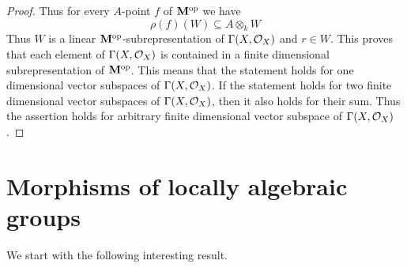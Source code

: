 \begin{proof}
Thus for every $A$-point $f$ of $\mathbf{M}^{\mathrm{op}}$ we have
$$\rho(f)\left(W\right) \subseteq A\otimes_kW$$
Thus $W$ is a linear $\mathbf{M}^{\mathrm{op}}$-subrepresentation of $\Gamma(X,{\mathcal O}_X)$ and $r\in W$. This proves that each element of $\Gamma(X,{\mathcal O}_X)$ is contained in a finite dimensional subrepresentation of $\mathbf{M}^{\mathrm{op}}$. This means that the statement holds for one dimensional vector subspaces of $\Gamma(X,{\mathcal O}_X)$. If the statement holds for two finite dimensional vector subspaces of $\Gamma(X,{\mathcal O}_X)$, then it also holds for their sum. Thus the assertion holds for arbitrary finite dimensional vector subspace of $\Gamma(X,{\mathcal O}_X)$.
\end{proof}


\section{Morphisms of locally algebraic groups}
\noindent
We start with the following interesting result.

